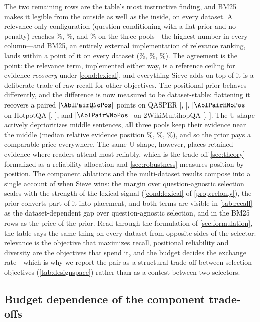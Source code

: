 \documentclass[pdflatex,sn-basic]{sn-jnl}
\DeclarePairedDelimiter\abs{\lvert}{\rvert}
\theoremstyle{remark}
\newcommand{\method}{Sieve}
\begin{document}
The two remaining rows are the table's most instructive finding, and
BM25 makes it legible from the outside as well as the inside, on
every dataset. A relevance-only configuration (question conditioning
with a flat prior and no penalty) reaches \AblXQRelOnly\%,
\AblXHRelOnly\%, and \AblXWRelOnly\% on the three pools---the
highest number in every column---and BM25, an entirely external
implementation of relevance ranking, lands within a point of it on
every dataset (\AblXQBm\%, \AblXHBm\%, \AblXWBm\%). The agreement is
the point: the relevance term, implemented either way, is a reference
ceiling for evidence \emph{recovery} under \autoref{cond:lexical},
and everything \method{} adds on top of it is a deliberate trade of
raw recall for other objectives. The positional prior behaves
differently, and the difference is now measured to be dataset-stable:
flattening it recovers a paired $\abs{\AblPairQNoPos}$ points on QASPER
[\AblPairQNoPosLo, \AblPairQNoPosHi], $\abs{\AblPairHNoPos}$ on
HotpotQA [\AblPairHNoPosLo, \AblPairHNoPosHi], and
$\abs{\AblPairWNoPos}$ on 2WikiMultihopQA [\AblPairWNoPosLo,
\AblPairWNoPosHi]. The U shape actively deprioritizes middle
sentences, all three pools keep their evidence near the middle (median
relative evidence position \PoolQMedPos\%, \PoolHMedPos\%,
\PoolWMedPos\%), and so the prior pays a comparable price everywhere.
The same U shape, however, places retained evidence where readers
attend most reliably, which is the trade-off \autoref{sec:theory}
formalized as a reliability allocation and \autoref{sec:robustness}
measures position by position. The component ablations and the
multi-dataset results compose into a single account of when \method{}
wins: the margin over question-agnostic selection scales with the
strength of the lexical signal (\autoref{cond:lexical} of
\autoref{prop:relonly}), the prior converts part of it into placement,
and both terms are visible in \autoref{tab:recall} as the
dataset-dependent gap over question-agnostic selection, and in the
BM25 rows as the price of the prior. Read through the formulation of
\autoref{sec:formulation}, the table says the same thing on every
dataset from opposite sides of the selector: relevance is the
objective that maximizes recall, positional reliability and diversity
are the objectives that spend it, and the budget decides the exchange
rate---which is why we report the pair as a structural trade-off
between selection objectives (\autoref{tab:designspace}) rather than
as a contest between two selectors.

\subsection{Budget dependence of the component trade-offs}
\label{sec:matrix}
\end{document}
